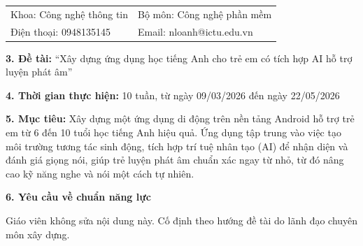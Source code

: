 \documentclass[../main.tex]{subfiles}
\begin{document}
	\vspace{0.15cm}
	\begin{tabular*}{\textwidth}{@{\extracolsep{\fill}}ll}
		Khoa: Công nghệ thông tin & Bộ môn: Công nghệ phần mềm\\[0.15cm]
		Điện thoại: 0948135145 & Email: nloanh@ictu.edu.vn
	\end{tabular*}
	
	\vspace{0.35cm}
	\textbf{3. Đề tài:} ``Xây dựng ứng dụng học tiếng Anh cho trẻ em có tích hợp AI hỗ trợ luyện phát âm''
	
	\vspace{0.35cm}
	\textbf{4. Thời gian thực hiện:} 10 tuần, từ ngày 09/03/2026 đến ngày 22/05/2026
	
	\vspace{0.35cm}
	\textbf{5. Mục tiêu:} Xây dựng một ứng dụng di động trên nền tảng Android hỗ trợ trẻ em từ 6 đến 10 tuổi học tiếng Anh hiệu quả. Ứng dụng tập trung vào việc tạo môi trường tương tác sinh động, tích hợp trí tuệ nhân tạo (AI) để nhận diện và đánh giá giọng nói, giúp trẻ luyện phát âm chuẩn xác ngay từ nhỏ, từ đó nâng cao kỹ năng nghe và nói một cách tự nhiên.
	
	\vspace{0.35cm}
	\textbf{6. Yêu cầu về chuẩn năng lực}
	
	Giáo viên không sửa nội dung này. Cố định theo hướng đề tài do lãnh đạo chuyên môn xây dựng.
	
	\vspace{0.3cm}
	
\end{document}
